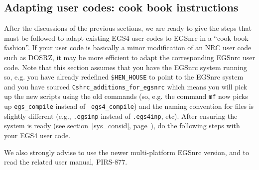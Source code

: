 \clearpage

\subsection{Adapting user codes: cook book instructions}

\label{instructions}

After the discussions of the previous sections, we are ready to give
the steps that must be followed to adapt existing EGS4 user codes to
EGSnrc in a ``cook book fashion''. If your user code is basically a minor
modification of an NRC user code such as DOSRZ, it may be more efficient
to adapt the corresponding EGSnrc user code. Note
that this section assumes that you have the EGSnrc system running so,
e.g. you have already redefined {\tt \$HEN\_HOUSE}  to point to the
EGSnrc system and you have sourced {\tt Cshrc\_additions\_for\_egsnrc}
which means you will pick up the new scripts using the old commands (so,
e.g. the command {\tt mf} now picks up {\tt egs\_compile} instead of {\tt
egs4\_compile}) and the naming convention for files is slightly different
(e.g., {\tt .egsinp} instead of {\tt .egs4inp}, etc).  After ensuring the
system is ready (see section~\ref{sys_consid}, page~\pageref{sys_consid}),
do the following steps with your EGS4 user code.

We also strongly advise to use the newer multi-platform EGSnrc version,
and to read the related user manual, PIRS-877.


